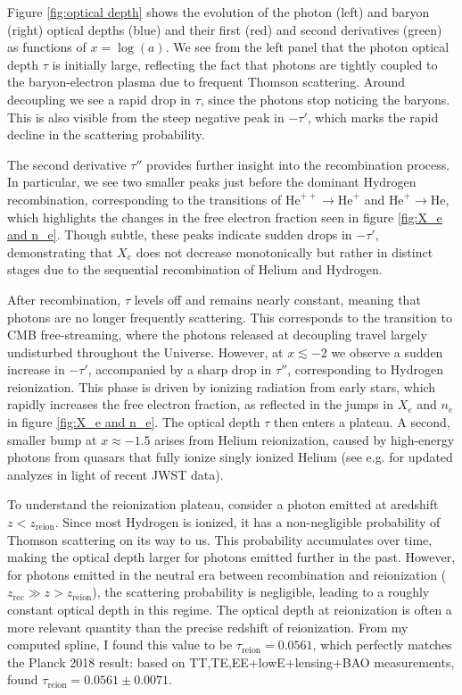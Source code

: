 \documentclass{aa}
\numberwithin{equation}{section}
\numberwithin{table}{section}
\numberwithin{figure}{section}
\begin{document}
Figure \ref{fig:optical depth} shows the evolution of the photon (left) and baryon (right) optical depths (blue) and their first (red) and second derivatives (green) as functions of $x = \log (a)$. We see from the left panel that the photon optical depth $\tau$ is initially large, reflecting the fact that photons are tightly coupled to the baryon-electron plasma due to frequent Thomson scattering. Around decoupling we see a rapid drop in $\tau$, since the photons stop noticing the baryons. This is also visible from the steep negative peak in $-\tau'$, which marks the rapid decline in the scattering probability. 

The second derivative $\tau''$ provides further insight into the recombination process. In particular, we see two smaller peaks just before the dominant Hydrogen recombination, corresponding to the transitions of $\text{He}^{++} \rightarrow \text{He}^{+}$ and $\text{He}^{+} \rightarrow \text{He}$, which highlights the changes in the free electron fraction seen in figure \ref{fig:X_e and n_e}. Though subtle, these peaks indicate sudden drops in $-\tau'$, demonstrating that $X_e$ does not decrease monotonically but rather in distinct stages due to the sequential recombination of Helium and Hydrogen.

After recombination, $\tau$ levels off and remains nearly constant, meaning that photons are no longer frequently scattering. This corresponds to the transition to CMB free-streaming, where the photons released at decoupling travel largely undisturbed throughout the Universe. However, at $x \lesssim -2$ we observe a sudden increase in $-\tau'$, accompanied by a sharp drop in $\tau''$, corresponding to Hydrogen reionization. This phase is driven by ionizing radiation from early stars, which rapidly increases the free electron fraction, as reflected in the jumps in $X_e$ and $n_e$ in figure \ref{fig:X_e and n_e}. The optical depth $\tau$ then enters a plateau. A second, smaller bump at $x \approx -1.5$ arises from Helium reionization, caused by high-energy photons from quasars that fully ionize singly ionized Helium (see e.g. \cite{Helium} for updated analyzes in light of recent JWST data).

To understand the reionization plateau, consider a photon emitted at aredshift $z<z_\text{reion}$. Since most Hydrogen is ionized, it has a non-negligible probability of Thomson scattering on its way to us. This probability accumulates over time, making the optical depth larger for photons emitted further in the past. However, for photons emitted in the neutral era between recombination and reionization ($z_\text{rec} \gg z > z_\text{reion}$), the scattering probability is negligible, leading to a roughly constant optical depth in this regime. The optical depth at reionization is often a more relevant quantity than the precise redshift of reionization. From my computed spline, I found this value to be $\tau_\text{reion} = 0.0561$, which perfectly matches the Planck 2018 result: based on TT,TE,EE+lowE+lensing+BAO measurements, \cite{Planck} found $\tau_\text{reion} = 0.0561 \pm 0.0071$.
\end{document}
